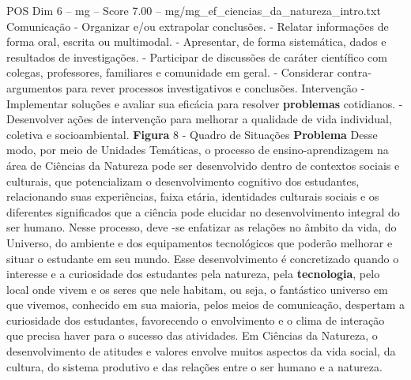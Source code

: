 \begin{textsample}{POS Dim 6 – mg – Score 7.00 – mg/mg\_ef\_ciencias\_da\_natureza\_intro.txt}
Comunicação - Organizar e/ou extrapolar conclusões. - Relatar informações de forma oral, escrita ou multimodal. - Apresentar, de forma sistemática, dados e resultados de investigações. - Participar de discussões de caráter científico com colegas, professores, familiares e comunidade em geral. - Considerar contra-argumentos para rever processos investigativos e conclusões.
Intervenção - Implementar soluções e avaliar sua eficácia para resolver \textbf{problemas} cotidianos. - Desenvolver ações de intervenção para melhorar a qualidade de vida individual, coletiva e socioambiental. \textbf{Figura} 8 - Quadro de Situações \textbf{Problema} Desse modo, por meio de Unidades Temáticas, o processo de ensino-aprendizagem na área de Ciências da Natureza pode ser desenvolvido dentro de contextos sociais e culturais, que potencializam o desenvolvimento cognitivo dos estudantes, relacionando suas experiências, faixa etária, identidades culturais sociais e os diferentes significados que a ciência pode elucidar no desenvolvimento integral do ser humano.
Nesse processo, deve -se enfatizar as relações no âmbito da vida, do Universo, do ambiente e dos equipamentos tecnológicos que poderão melhorar e situar o estudante em seu mundo.
Esse desenvolvimento é concretizado quando o interesse e a curiosidade dos estudantes pela natureza, pela \textbf{tecnologia}, pelo local onde vivem e os seres que nele habitam, ou seja, o fantástico universo em que vivemos, conhecido em sua maioria, pelos meios de comunicação, despertam a curiosidade dos estudantes, favorecendo o envolvimento e o clima de interação que precisa haver para o sucesso das atividades.
Em Ciências da Natureza, o desenvolvimento de atitudes e valores envolve muitos aspectos da vida social, da cultura, do sistema produtivo e das relações entre o ser humano e a natureza.

\end{textsample}
